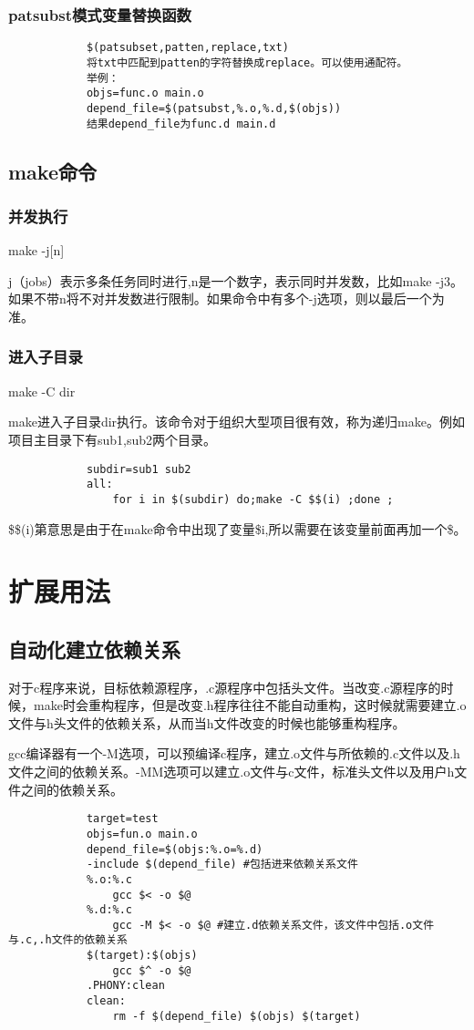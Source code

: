 \documentclass{article}
\begin{document}
\begin{CJK}{UTF8}{gbsn}
		\subsubsection{patsubst模式变量替换函数}
		\begin{verbatim}
			$(patsubset,patten,replace,txt)
			将txt中匹配到patten的字符替换成replace。可以使用通配符。
			举例：
			objs=func.o main.o
			depend_file=$(patsubst,%.o,%.d,$(objs))
			结果depend_file为func.d main.d
		\end{verbatim}

	\subsection{make命令}
	\subsubsection{并发执行}
		make -j[n]\par
		j（jobs）表示多条任务同时进行,n是一个数字，表示同时并发数，比如make -j3。如果不带n将不对并发数进行限制。如果命令中有多个-j选项，则以最后一个为准。
	\subsubsection{进入子目录}
		make -C  dir\par
		make进入子目录dir执行。该命令对于组织大型项目很有效，称为递归make。例如项目主目录下有sub1,sub2两个目录。\par
		\begin{verbatim}
			subdir=sub1 sub2
			all:
			    for i in $(subdir) do;make -C $$(i) ;done ;
		\end{verbatim}\par
		\$\$(i)第意思是由于在make命令中出现了变量\$i,所以需要在该变量前面再加一个\$。	
	\section{扩展用法}
	\subsection{自动化建立依赖关系}
		对于c程序来说，目标依赖源程序，.c源程序中包括头文件。当改变.c源程序的时候，make时会重构程序，但是改变.h程序往往不能自动重构，这时候就需要建立.o文件与h头文件的依赖关系，从而当h文件改变的时候也能够重构程序。
		\par
		gcc编译器有一个-M选项，可以预编译c程序，建立.o文件与所依赖的.c文件以及.h文件之间的依赖关系。-MM选项可以建立.o文件与c文件，标准头文件以及用户h文件之间的依赖关系。
		\begin{verbatim}
			target=test
			objs=fun.o main.o
			depend_file=$(objs:%.o=%.d)
			-include $(depend_file) #包括进来依赖关系文件
			%.o:%.c
			    gcc $< -o $@
			%.d:%.c
			    gcc -M $< -o $@ #建立.d依赖关系文件，该文件中包括.o文件与.c,.h文件的依赖关系
			$(target):$(objs)
			    gcc $^ -o $@
			.PHONY:clean
			clean:
			    rm -f $(depend_file) $(objs) $(target)
		\end{verbatim}


\end{CJK}
\end{document}
